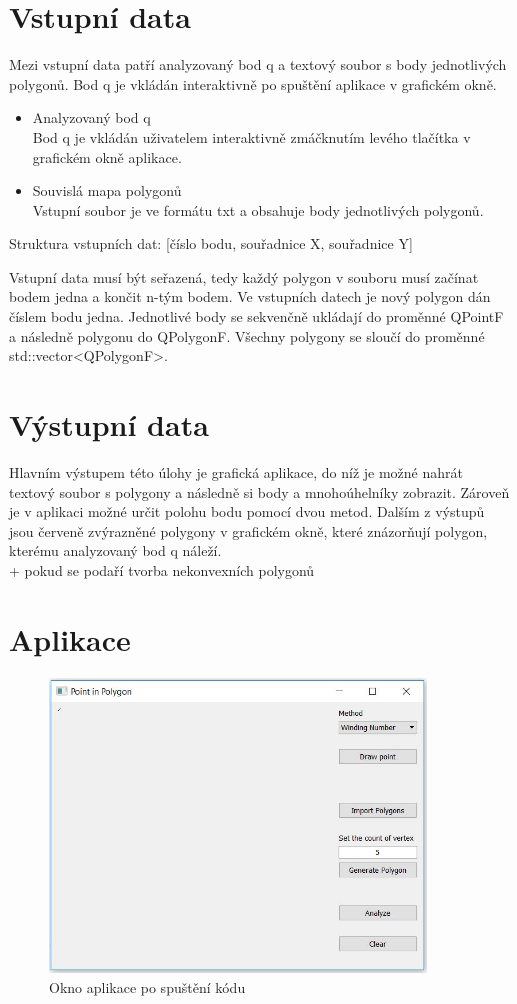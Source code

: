 \documentclass[a4paper, 12pt]{article}
\begin{document}
\section{Vstupní data}
Mezi vstupní data patří analyzovaný bod q a textový soubor s body jednotlivých polygonů. Bod q je vkládán interaktivně po spuštění aplikace v grafickém okně. 
\\
\begin{itemize}
\item Analyzovaný bod q\\
Bod q je vkládán uživatelem interaktivně zmáčknutím levého tlačítka v grafickém okně aplikace.

\item Souvislá mapa polygonů\\
Vstupní soubor je ve formátu txt a obsahuje body jednotlivých polygonů.
\end{itemize}

Struktura vstupních dat:
[číslo bodu, souřadnice X, souřadnice Y]

Vstupní data musí být seřazená, tedy každý polygon v souboru musí začínat bodem jedna a končit n-tým bodem.  Ve vstupních datech je nový polygon dán číslem bodu jedna. Jednotlivé body se sekvenčně ukládají do proměnné QPointF a následně polygonu do QPolygonF. Všechny polygony se sloučí do proměnné  std::vector<QPolygonF>.

\section{Výstupní data}
Hlavním výstupem této úlohy je grafická aplikace, do níž je možné nahrát textový soubor s polygony a následně si body a mnohoúhelníky zobrazit. Zároveň je v aplikaci možné určit polohu bodu pomocí dvou metod. Dalším z výstupů jsou červeně zvýrazněné polygony v grafickém okně, které znázorňují polygon, kterému analyzovaný bod q náleží.
\\
+ pokud se podaří tvorba nekonvexních polygonů

\clearpage
\section{Aplikace}

\begin{figure}[h!]
	\centering
	\includegraphics[width=10cm]{okno.jpg}
	\caption{Okno aplikace po spuštění kódu}
\end{figure}
\end{document}
